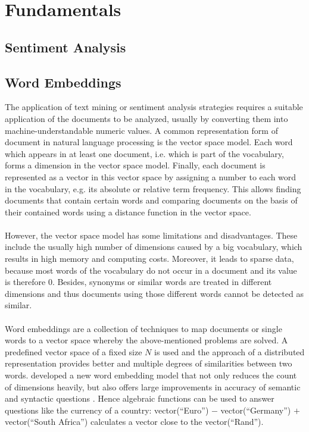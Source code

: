 \documentclass[article,type=msc,colorback,accentcolor=tud7b]{tudthesis}
\begin{document}
  \section{Fundamentals}
  
  \subsection{Sentiment Analysis}

  \subsection{Word Embeddings}
  \label{subsec:word_embeddings}
    The application of text mining or sentiment analysis strategies requires a suitable application of the documents to be analyzed, usually by converting them into machine-understandable numeric values. A common representation form of document in natural language processing is the vector space model. Each word which appears in at least one document, i.e. which is part of the vocabulary, forms a dimension in the vector space model. Finally, each document is represented as a vector in this vector space by assigning a number to each word in the vocabulary, e.g. its absolute or relative term frequency. This allows finding documents that contain certain words and comparing documents on the basis of their contained words using a distance function in the vector space. \\\\
    However, the vector space model has some limitations and disadvantages. These include the usually high number of dimensions caused by a big vocabulary, which results in high memory and computing costs. Moreover, it leads to sparse data, because most words of the vocabulary do not occur in a document and its value is therefore $0$. Besides, synonyms or similar words are treated in different dimensions and thus documents using those different words cannot be detected as similar. \\\\
    Word embeddings are a collection of techniques to map documents or single words to a vector space whereby the above-mentioned problems are solved. A predefined vector space of a fixed size $N$ is used and the approach of a distributed representation provides better and multiple degrees of similarities between two words. \citeauthor{Mikolov2013} developed a new word embedding model that not only reduces the count of dimensions heavily, but also offers large improvements in accuracy of semantic and syntactic questions \autocite{Mikolov2013}. Hence algebraic functions can be used to answer questions like the currency of a country: vector(“Euro”) $-$ vector(“Germany”) $+$ vector(“South Africa”) calculates a vector close to the vector(“Rand”). \\\\
\end{document}
